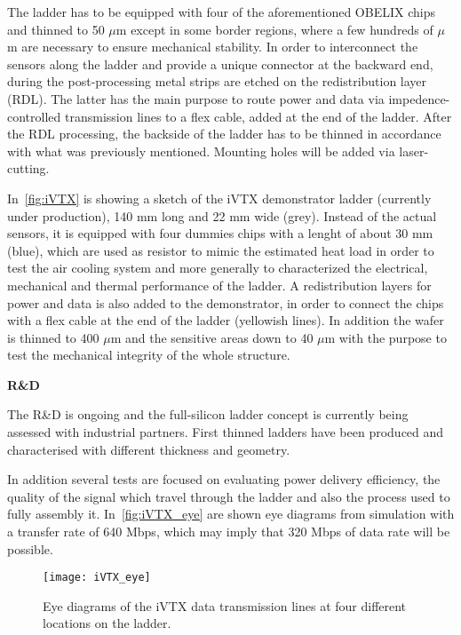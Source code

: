 The ladder has to be equipped with four of the aforementioned OBELIX chips and thinned to 50 $\mu$m except in some border regions, where a few hundreds of $\mu$m are necessary to ensure mechanical stability. 
In order to interconnect the sensors along the ladder and provide a unique connector at the backward end, during the post-processing metal strips are etched on the redistribution layer (RDL). The latter has the main purpose to route power and data via impedence-controlled transmission lines to a flex cable, added at the end of the ladder.
After the RDL processing, the backside of the ladder has to be thinned in accordance with what was previously mentioned. Mounting holes will be added via laser-cutting.


In~\autoref{fig:iVTX} is showing a sketch of the iVTX demonstrator ladder (currently under production), 140 mm long and 22 mm wide (grey). Instead of the actual sensors, it is equipped with four dummies chips with a lenght of about 30 mm (blue), which are used as resistor to mimic the estimated heat load in order to test the air cooling system and more generally to characterized the electrical, mechanical and thermal performance of the ladder.
A redistribution layers for power and data is also added to the demonstrator, in order to connect the chips with a flex cable at the end of the ladder (yellowish lines). In addition the wafer is thinned to 400 $\mu$m and the sensitive areas down to 40 $\mu$m with the purpose to test the mechanical integrity of the whole structure.

\begin{description}
\item \textbf{R\&D}
\end{description}

The R\&D is ongoing and the full-silicon ladder concept is currently being assessed with industrial partners. First thinned ladders have been produced and characterised with different thickness and geometry.%

In addition several tests are focused on evaluating power delivery efficiency, the quality of the signal which travel through the ladder and also the process used to fully assembly it. 
In~\autoref{fig:iVTX_eye} are shown eye diagrams from simulation with a transfer rate of 640 Mbps, which may imply that 320 Mbps of data rate will be possible.

\begin{figure}[h!]
\centering
\texttt{[image: iVTX\_eye]}
\caption{Eye diagrams of the iVTX data transmission lines at four different locations on the ladder.}
\label{fig:iVTX_eye}
\end{figure}

